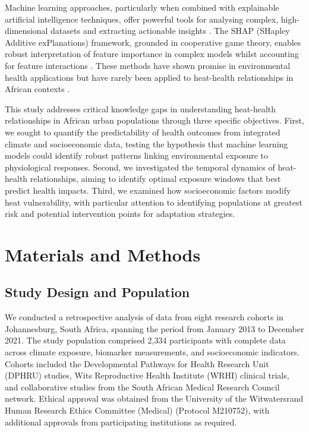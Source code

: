\documentclass[11pt,a4paper]{article}
\begin{document}
Machine learning approaches, particularly when combined with explainable artificial intelligence techniques, offer powerful tools for analysing complex, high-dimensional datasets and extracting actionable insights \citep{Rajkomar2019, Beam2021}. The SHAP (SHapley Additive exPlanations) framework, grounded in cooperative game theory, enables robust interpretation of feature importance in complex models whilst accounting for feature interactions \citep{Lundberg2017, Lundberg2020}. These methods have shown promise in environmental health applications but have rarely been applied to heat-health relationships in African contexts \citep{Nori2019, Chen2022}.

This study addresses critical knowledge gaps in understanding heat-health relationships in African urban populations through three specific objectives. First, we sought to quantify the predictability of health outcomes from integrated climate and socioeconomic data, testing the hypothesis that machine learning models could identify robust patterns linking environmental exposure to physiological responses. Second, we investigated the temporal dynamics of heat-health relationships, aiming to identify optimal exposure windows that best predict health impacts. Third, we examined how socioeconomic factors modify heat vulnerability, with particular attention to identifying populations at greatest risk and potential intervention points for adaptation strategies.

\section{Materials and Methods}

\subsection{Study Design and Population}

We conducted a retrospective analysis of data from eight research cohorts in Johannesburg, South Africa, spanning the period from January 2013 to December 2021. The study population comprised 2,334 participants with complete data across climate exposure, biomarker measurements, and socioeconomic indicators. Cohorts included the Developmental Pathways for Health Research Unit (DPHRU) studies, Wits Reproductive Health Institute (WRHI) clinical trials, and collaborative studies from the South African Medical Research Council network. Ethical approval was obtained from the University of the Witwatersrand Human Research Ethics Committee (Medical) (Protocol M210752), with additional approvals from participating institutions as required.
\end{document}
